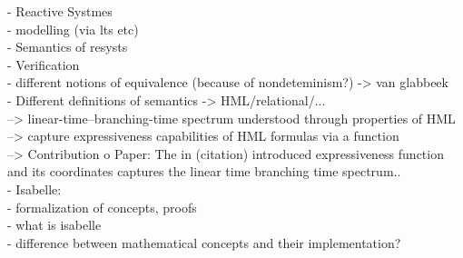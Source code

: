 \begin{isabellebody}
\begin{isamarkuptext}
- Reactive Systmes \\
  - modelling (via lts etc) \\
  - Semantics of resysts \\
    - Verification \\
    - different notions of equivalence (because of nondeteminism?) -> van glabbeek \\
    - Different definitions of semantics -> HML/relational/... \\
 --> linear-time--branching-time spectrum understood through properties of HML \\
  --> capture expressiveness capabilities of HML formulas via a function \\
--> Contribution o Paper: The in (citation) introduced expressiveness function 
and its coordinates captures the linear time branching time spectrum.. \\
- Isabelle:\\
  - formalization of concepts, proofs \\
  - what is isabelle \\
  - difference between mathematical concepts and their implementation? \\%
\end{isamarkuptext}\isamarkuptrue%
%
\isadelimtheory
%
\endisadelimtheory
%
\isatagtheory
%
\endisatagtheory
{\isafoldtheory}%
%
\isadelimtheory
%
\endisadelimtheory
%
\end{isabellebody}%
\endinput
